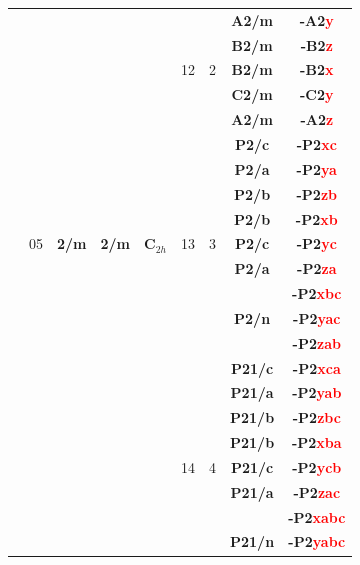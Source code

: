 \documentclass{article}      %
\begin{document}
\begin{small}
\begin{longtable}[c]{|c|c|c|c|c|c|c|c|c|}
 & & & & & & &\textbf{A2/m} &\textbf{-A2\textcolor{red}{y}}  \\\cline{8-9}
 & & & & & & &\textbf{B2/m} &\textbf{-B2\textcolor{red}{z}}  \\\cline{8-9}
 & & & & &\textrm{12} &2&\textbf{B2/m} &\textbf{-B2\textcolor{red}{x}}  \\\cline{8-9}
 & & & & & & &\textbf{C2/m} &\textbf{-C2\textcolor{red}{y}}  \\\cline{8-9}
 & & & & & & &\textbf{A2/m} &\textbf{-A2\textcolor{red}{z}}  \\\cline{6-9}
 & & & & & & &\textbf{P2/c} &\textbf{-P2\textcolor{red}{xc}}  \\\cline{8-9}
 & & & & & & &\textbf{P2/a} &\textbf{-P2\textcolor{red}{ya}}  \\\cline{8-9}
 & & & & & & &\textbf{P2/b} &\textbf{-P2\textcolor{red}{zb}}  \\\cline{8-9}
 & & & & & & &\textbf{P2/b} &\textbf{-P2\textcolor{red}{xb}}  \\\cline{8-9}
 & \textrm{05} &\textbf{2/m} &\textbf{2/m} &$\mathbf{C}_{2h}$ &\textrm{13} &3 &\textbf{P2/c}&\textbf{-P2\textcolor{red}{yc}} \\\cline{8-9}
 & & & & & & &\textbf{P2/a} &\textbf{-P2\textcolor{red}{za}}  \\\cline{8-9}
 & & & & & & & &\textbf{-P2\textcolor{red}{xbc}}  \\\cline{9-9}
 & & & & & & &\textbf{P2/n} &\textbf{-P2\textcolor{red}{yac}}  \\\cline{9-9}
 & & & & & & & &\textbf{-P2\textcolor{red}{zab}}  \\\cline{6-9}
 & & & & & & &\textbf{P21/c} &\textbf{-P2\textcolor{red}{xca}}  \\\cline{8-9}
 & & & & & & &\textbf{P21/a} &\textbf{-P2\textcolor{red}{yab}}  \\\cline{8-9}
 & & & & & & &\textbf{P21/b} &\textbf{-P2\textcolor{red}{zbc}}  \\\cline{8-9}
 & & & & & & &\textbf{P21/b} &\textbf{-P2\textcolor{red}{xba}}  \\\cline{8-9}
 & & & & &\textrm{14} &4 &\textbf{P21/c}&\textbf{-P2\textcolor{red}{ycb}} \\\cline{8-9}
 & & & & & & &\textbf{P21/a} &\textbf{-P2\textcolor{red}{zac}}  \\\cline{8-9}
 & & & & & & & &\textbf{-P2\textcolor{red}{xabc}}  \\\cline{9-9}
 & & & & & & &\textbf{P21/n} &\textbf{-P2\textcolor{red}{yabc}}  \\\cline{9-9}

\end{longtable}
\end{small}
\end{document}
